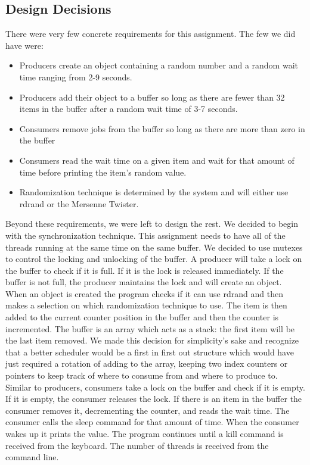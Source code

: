 \documentclass[letterpaper,10pt,serif,draftclsnofoot,onecolumn,compsoc,titlepage]{article}%
\begin{document}
\subsection{Design Decisions}
There were very few concrete requirements for this assignment. The few we
did have were:
\begin{itemize}
\item Producers create an object containing a random number and a random
wait time ranging from 2-9 seconds.
\item Producers add their object to a buffer so long as there are fewer
than 32 items in the buffer after a random wait time of 3-7 seconds.
\item Consumers remove jobs from the buffer so long as there are more than
zero in the buffer
\item Consumers read the wait time on a given item and wait for that amount
of time before printing the item's random value.
\item Randomization technique is determined by the system and will either
use rdrand or the Mersenne Twister.
\end{itemize}
Beyond these requirements, we were left to design the rest. We decided to
begin with the synchronization technique. This assignment needs to have
all of the threads running at the same time on the same buffer. We decided
to use mutexes to control the locking and unlocking of the buffer. A
producer will take a lock on the buffer to check if it is full. If it is
the lock is released immediately. If the buffer is not full, the producer
maintains the lock and will create an object. When an object is created
the program checks if it can use rdrand and then makes a selection on
which randomization technique to use. The item is then added to the current
counter position in the buffer and then the counter is incremented. The
buffer is an array which acts as a stack: the first item will be the last
item removed. We made this decision for simplicity's sake and recognize
that a better scheduler would be a first in first out structure which
would have just required a rotation of adding to the array, keeping two
index counters or pointers to keep track of where to consume from and
where to produce to. Similar to producers, consumers take a lock on the
buffer and check if it is empty. If it is empty, the consumer releases the
lock. If there is an item in the buffer the consumer removes it,
decrementing the counter, and reads the wait time. The consumer calls the
sleep command for that amount of time. When the consumer wakes up it prints
the value. The program continues until a kill command is received from the
keyboard. The number of threads is received from the command line.
\end{document}
